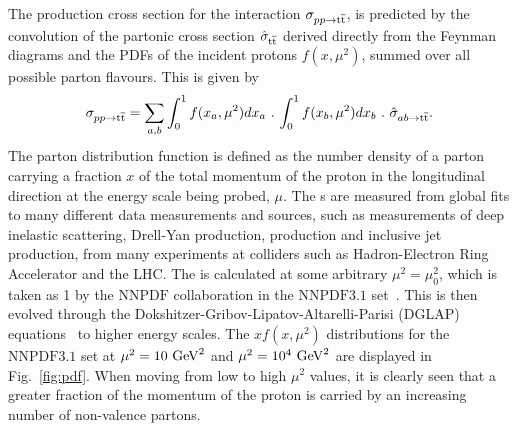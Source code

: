 The production cross section for the interaction $\sigma_{pp\to\mathrm{t}\overline{\mathrm{t}}{}}$, is predicted by the convolution of the partonic cross section $\hat{\sigma}_{\mathrm{t}\overline{\mathrm{t}}{}}$ derived directly from the Feynman diagrams and the PDFs of the incident protons $f(x, \mu^{2})$, summed over all possible parton flavours.
This is given by
\begin{equation}
\label{eq:pdf}
	\sigma_{pp\to\mathrm{t}\overline{\mathrm{t}}{}} = \sum_{a, b}\int_{0}^{1}f(x_{a}, \mu^{2})dx_{a}\,\,.\,\int_{0}^{1}f(x_{b}, \mu^{2})dx_{b}\,\,.\,\,\hat{\sigma}_{ab\to\mathrm{t}\overline{\mathrm{t}}{}}.
\end{equation}
The parton distribution function is defined as the number density of a parton carrying a fraction $x$ of the total momentum of the proton in the longitudinal direction at the energy scale being probed, $\mu$.
The \PDF{}s are measured from global fits to many different data measurements and sources, such as measurements of deep inelastic scattering, Drell-Yan production, \ttbar{} production and inclusive jet production, from many experiments at colliders such as Hadron-Electron Ring Accelerator and the LHC.
The \PDF{} is calculated at some arbitrary $\mu^{2} = \mu^{2}_{0}$, which is taken as 1\GeV{} by the $\mathrm{NNPDF}$ collaboration in the $\mathrm{NNPDF3.1}$ \PDF{} set~\cite{NNPDF3p1}.
This is then evolved through the Dokshitzer-Gribov-Lipatov-Altarelli-Parisi (DGLAP) equations~\cite{Th:D, Th:GL, Th:AP} to higher energy scales.
The $xf(x, \mu^{2})$ distributions for the $\mathrm{NNPDF3.1}$ \PDF{} set at $\mu^{2} = 10\mathrm{~Ge\hspace{-.08em}V}^{2}$ and $\mu^{2} = 10^{4}\mathrm{~Ge\hspace{-.08em}V}^{2}$ are displayed in Fig.~\ref{fig:pdf}.
When moving from low to high $\mu^{2}$ values, it is clearly seen that a greater fraction of the momentum of the proton is carried by an increasing number of non-valence partons.
